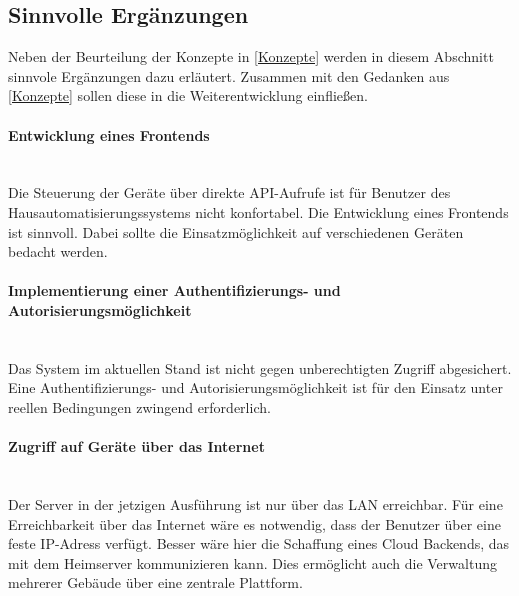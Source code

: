 \subsection{Sinnvolle Ergänzungen}
Neben der Beurteilung der Konzepte in \autoref{Konzepte} werden in diesem Abschnitt sinnvole Ergänzungen dazu erläutert. Zusammen mit den Gedanken aus \autoref{Konzepte} sollen diese in die Weiterentwicklung einfließen.
\paragraph{Entwicklung eines Frontends}\mbox{}\\
Die Steuerung der Geräte über direkte API-Aufrufe ist für Benutzer des Hausautomatisierungssystems nicht konfortabel. Die Entwicklung eines Frontends ist sinnvoll. Dabei sollte die Einsatzmöglichkeit auf verschiedenen Geräten bedacht werden.
\paragraph{Implementierung einer Authentifizierungs- und Autorisierungsmöglichkeit}\mbox{}\\
Das System im aktuellen Stand ist nicht gegen unberechtigten Zugriff abgesichert. Eine Authentifizierungs- und Autorisierungsmöglichkeit ist für den Einsatz unter reellen Bedingungen zwingend erforderlich.
\paragraph{Zugriff auf Geräte über das Internet}\mbox{}\\
Der Server in der jetzigen Ausführung ist nur über das LAN erreichbar. Für eine Erreichbarkeit über das Internet wäre es notwendig, dass der Benutzer über eine feste IP-Adress verfügt. Besser wäre hier die Schaffung eines Cloud Backends, das mit dem Heimserver kommunizieren kann. Dies ermöglicht auch die Verwaltung mehrerer Gebäude über eine zentrale Plattform.


